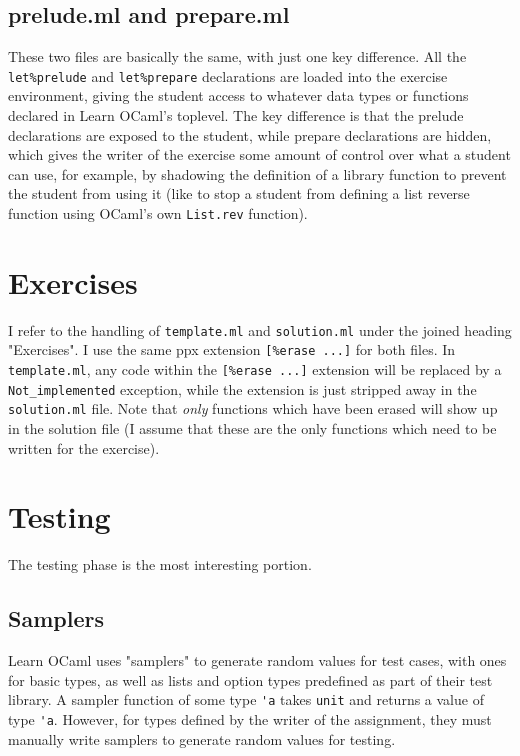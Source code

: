\documentclass[11pt]{article}
\begin{document}
\subsection{prelude.ml and prepare.ml}
These two files are basically the same, with just one key difference. All the \verb+let%prelude+ and \verb+let%prepare+ declarations are loaded into the exercise environment, giving the student access to whatever data types or functions declared in Learn OCaml's toplevel. The key difference is that the prelude declarations are exposed to the student, while prepare declarations are hidden, which gives the writer of the exercise some amount of control over what a student can use, for example, by shadowing the definition of a library function to prevent the student from using it (like to stop a student from defining a list reverse function using OCaml's own \verb+List.rev+ function).

\section{Exercises}
I refer to the handling of \verb+template.ml+ and \verb+solution.ml+ under the joined heading "Exercises". I use the same ppx extension \verb+[%erase ...]+ for both files. In \verb+template.ml+, any code within the \verb+[%erase ...]+ extension will be replaced by a \verb+Not_implemented+ exception, while the extension is just stripped away in the \verb+solution.ml+ file. Note that \textit{only} functions which have been erased will show up in the solution file (I assume that these are the only functions which need to be written for the exercise).

\section{Testing}
The testing phase is the most interesting portion.

\subsection{Samplers}
Learn OCaml uses "samplers" to generate random values for test cases, with ones for basic types, as well as lists and option types predefined as part of their test library. A sampler function of some type \verb+'a+ takes \verb+unit+ and returns a value of type \verb+'a+. However, for types defined by the writer of the assignment, they must manually write samplers to generate random values for testing.
\end{document}
